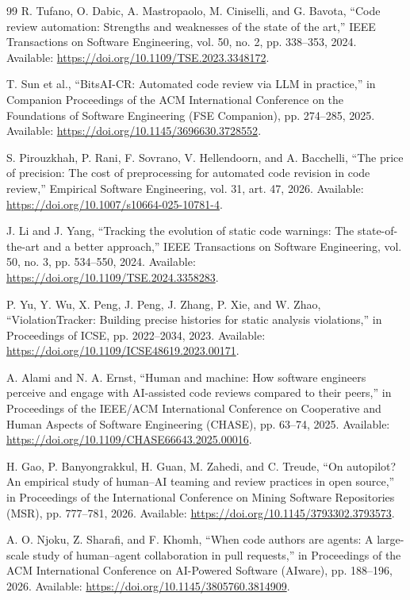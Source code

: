 \documentclass[10pt,conference,letterpaper]{IEEEtran}
\begin{document}
\begin{thebibliography}{99}
 R. Tufano, O. Dabic, A. Mastropaolo, M. Ciniselli, and G. Bavota, “Code review automation: Strengths and weaknesses of the state of the art,” IEEE Transactions on Software Engineering, vol. 50, no. 2, pp. 338–353, 2024. Available: \url{https://doi.org/10.1109/TSE.2023.3348172}.

 T. Sun et al., “BitsAI-CR: Automated code review via LLM in practice,” in Companion Proceedings of the ACM International Conference on the Foundations of Software Engineering (FSE Companion), pp. 274–285, 2025. Available: \url{https://doi.org/10.1145/3696630.3728552}.

 S. Pirouzkhah, P. Rani, F. Sovrano, V. Hellendoorn, and A. Bacchelli, “The price of precision: The cost of preprocessing for automated code revision in code review,” Empirical Software Engineering, vol. 31, art. 47, 2026. Available: \url{https://doi.org/10.1007/s10664-025-10781-4}.

 J. Li and J. Yang, “Tracking the evolution of static code warnings: The state-of-the-art and a better approach,” IEEE Transactions on Software Engineering, vol. 50, no. 3, pp. 534–550, 2024. Available: \url{https://doi.org/10.1109/TSE.2024.3358283}.

 P. Yu, Y. Wu, X. Peng, J. Peng, J. Zhang, P. Xie, and W. Zhao, “ViolationTracker: Building precise histories for static analysis violations,” in Proceedings of ICSE, pp. 2022–2034, 2023. Available: \url{https://doi.org/10.1109/ICSE48619.2023.00171}.

 A. Alami and N. A. Ernst, “Human and machine: How software engineers perceive and engage with AI-assisted code reviews compared to their peers,” in Proceedings of the IEEE/ACM International Conference on Cooperative and Human Aspects of Software Engineering (CHASE), pp. 63–74, 2025. Available: \url{https://doi.org/10.1109/CHASE66643.2025.00016}.

 H. Gao, P. Banyongrakkul, H. Guan, M. Zahedi, and C. Treude, “On autopilot? An empirical study of human–AI teaming and review practices in open source,” in Proceedings of the International Conference on Mining Software Repositories (MSR), pp. 777–781, 2026. Available: \url{https://doi.org/10.1145/3793302.3793573}.

 A. O. Njoku, Z. Sharafi, and F. Khomh, “When code authors are agents: A large-scale study of human–agent collaboration in pull requests,” in Proceedings of the ACM International Conference on AI-Powered Software (AIware), pp. 188–196, 2026. Available: \url{https://doi.org/10.1145/3805760.3814909}.


\end{thebibliography}
\end{document}
